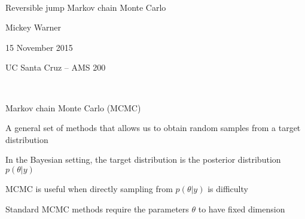 \documentclass[mathserif, 12pt, t]{beamer}
\newcommand{\m}[1]{#1}
\renewcommand{\frametitle}[1]{\vspace{0.14cm}\hspace{-0.70cm}\textcolor{col2}{%
    \Large{#1}}\vspace{0.15cm}\newline}
\begin{document}
\begin{center}
\ \\ [-0.5in]
\vfill
\bigskip
\bigskip
\bigskip
\bigskip
\bigskip

\begin{Large}
\begin{center}
Reversible jump Markov chain Monte Carlo
\end{center}
\end{Large}
\vfill

Mickey Warner
\vfill

15 November 2015
\smallskip

UC Santa Cruz -- AMS 200

\bigskip
\bigskip
\vfill
\ \\ [-0.5in]
\end{center}



\begin{frame}
\frametitle{Markov chain Monte Carlo (MCMC)}

A general set of methods that allows us to obtain random samples from a target distribution
\bigskip

In the Bayesian setting, the target distribution is the posterior distribution $p(\m{\theta}|\m{y})$
\bigskip

MCMC is useful when directly sampling from $p(\m{\theta}|\m{y})$ is difficulty
\bigskip

Standard MCMC methods require the parameters $\m{\theta}$ to have fixed dimension


\end{frame}
\end{document}
